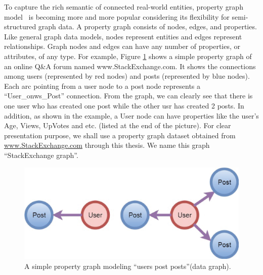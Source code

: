 To capture the rich semantic of connected real-world entities, property graph model~\cite{} is becoming more and more popular considering its flexibility for semi-structured graph data. A property graph consists of nodes, edges, and properties. Like general graph data models, nodes represent entities and edges represent relationships. Graph nodes and edges can have any number of properties, or attributes, of any type. For example, Figure \ref{fig:1} shows a simple property graph of an online Q\&A forum named www.StackExchange.com. It shows the connections among users (represented by red nodes) and posts (represented by blue nodes). Each arc pointing from a user node  to a post node represents a ``User\_onws\_Post'' connection. From the graph, we can clearly see that  there is one user who has created one post while the other usr has created 2 posts. In addition, as shown in the example, a User node can have properties like the user’s Age, Views, UpVotes and etc. (listed at the end of the picture).
For clear presentation purpose, we shall use a property graph dataset obtained from \url{www.StackExchange.com} through this thesis. We name this graph ``StackExchange graph''.


\begin{figure}
\centering
\includegraphics[scale=0.4]{pic/11.eps}
\caption{A simple property graph modeling ``users post posts''(data graph).}
\label{fig:1}
\end{figure}






